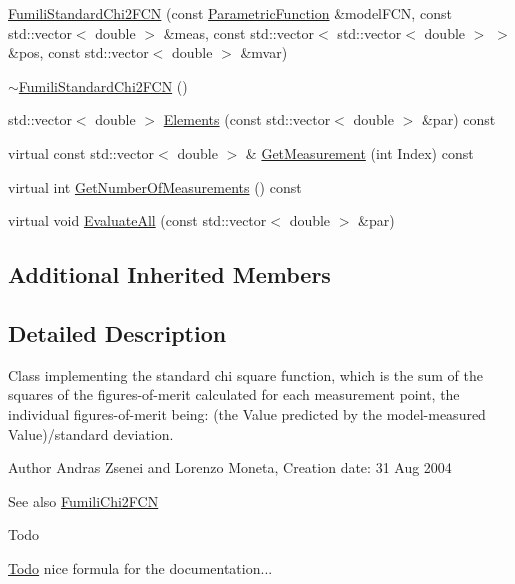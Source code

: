 \begin{DoxyCompactItemize}
\mbox{\hyperlink{classROOT_1_1Minuit2_1_1FumiliStandardChi2FCN_a9a18cdf86c47d62aed4298120a44a601}{Fumili\+Standard\+Chi2\+F\+CN}} (const \mbox{\hyperlink{classROOT_1_1Minuit2_1_1ParametricFunction}{Parametric\+Function}} \&model\+F\+CN, const std\+::vector$<$ double $>$ \&meas, const std\+::vector$<$ std\+::vector$<$ double $>$ $>$ \&pos, const std\+::vector$<$ double $>$ \&mvar)
\item 
\mbox{\hyperlink{classROOT_1_1Minuit2_1_1FumiliStandardChi2FCN_a74d68d4f8ee38aff21a0e5a4e7d4173b}{$\sim$\+Fumili\+Standard\+Chi2\+F\+CN}} ()
\item 
std\+::vector$<$ double $>$ \mbox{\hyperlink{classROOT_1_1Minuit2_1_1FumiliStandardChi2FCN_ab05d3fe2dcb9b1c56b6753debe5e0064}{Elements}} (const std\+::vector$<$ double $>$ \&par) const
\item 
virtual const std\+::vector$<$ double $>$ \& \mbox{\hyperlink{classROOT_1_1Minuit2_1_1FumiliStandardChi2FCN_a3bbc9a9cb77ce45aa764aa1f6e74349c}{Get\+Measurement}} (int Index) const
\item 
virtual int \mbox{\hyperlink{classROOT_1_1Minuit2_1_1FumiliStandardChi2FCN_a868b7c1aa7d2597db475ca99799c9131}{Get\+Number\+Of\+Measurements}} () const
\item 
virtual void \mbox{\hyperlink{classROOT_1_1Minuit2_1_1FumiliStandardChi2FCN_ace15dd1aad435e460c523bc37bff12a8}{Evaluate\+All}} (const std\+::vector$<$ double $>$ \&par)
\end{DoxyCompactItemize}
\subsection*{Additional Inherited Members}


\subsection{Detailed Description}
Class implementing the standard chi square function, which is the sum of the squares of the figures-\/of-\/merit calculated for each measurement point, the individual figures-\/of-\/merit being\+: (the Value predicted by the model-\/measured Value)/standard deviation.

\begin{DoxyAuthor}{Author}
Andras Zsenei and Lorenzo Moneta, Creation date\+: 31 Aug 2004
\end{DoxyAuthor}
\begin{DoxySeeAlso}{See also}
\mbox{\hyperlink{classROOT_1_1Minuit2_1_1FumiliChi2FCN}{Fumili\+Chi2\+F\+CN}}
\end{DoxySeeAlso}
\begin{DoxyRefDesc}{Todo}
\item[\mbox{\hyperlink{todo__todo000009}{Todo}}]nice formula for the documentation...\end{DoxyRefDesc}


